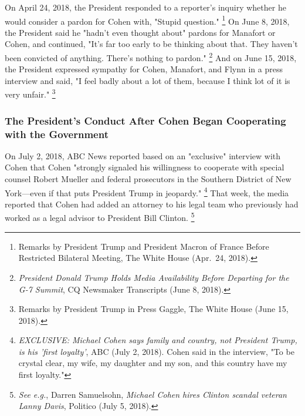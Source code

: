 {On April 24, 2018, the President responded to a reporter's inquiry whether he would consider a pardon for Cohen with, "Stupid question."%
\footnote{Remarks by President Trump and President Macron of France Before Restricted Bilateral Meeting, The White House (Apr.~24, 2018).}
On June 8, 2018, the President said he "hadn't even thought about" pardons for Manafort or Cohen, and continued, "It's far too early to be thinking about that.
They haven't been convicted of anything.
There's nothing to pardon."%
\footnote{\textit{President Donald Trump Holds Media Availability Before Departing for the G-7 Summit}, CQ Newsmaker Transcripts (June 8, 2018).}
And on June 15, 2018, the President expressed sympathy for Cohen, Manafort, and Flynn in a press interview and said, "I feel badly about a lot of them, because I think lot of it is very unfair."%
\footnote{Remarks by President Trump in Press Gaggle, The White House (June 15, 2018).}

\subsubsection{The President's Conduct After Cohen Began Cooperating with the Government}

On July 2, 2018, ABC News reported based on an "exclusive" interview with Cohen that Cohen "strongly signaled his willingness to cooperate with special counsel Robert Mueller and federal prosecutors in the Southern District of New York---even if that puts President Trump in jeopardy."%
\footnote{\textit{EXCLUSIVE: Michael Cohen says family and country, not President Trump, is his 'first loyalty'}, ABC (July 2, 2018).
Cohen said in the interview, "To be crystal clear, my wife, my daughter and my son, and this country have my first loyalty."}
That week, the media reported that Cohen had added an attorney to his legal team who previously had worked as a legal advisor to President Bill Clinton.%
\footnote{\textit{See e.g.}, Darren Samuelsohn, \textit{Michael Cohen hires Clinton scandal veteran Lanny Davis}, Politico (July 5, 2018).}

}
